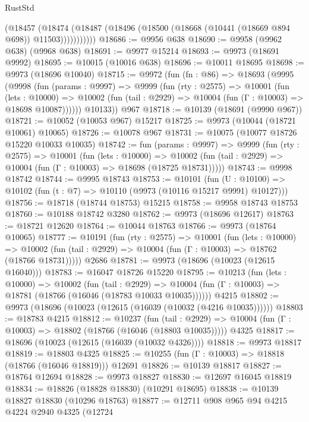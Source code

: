 \begin{lexlean}{RustStd}
\begin{coremodule}
              (@18457
                (@18474
                  (@18487 (@18496 (@18500 (@18668 (@10441 (@18669 @894 @698)) @11503)))))))))))
@18686 := @9956 @638
@18690 := @9958 (@9962 @638) (@9968 @638)
@18691 := @9977 @15214
@18693 := @9973 (@18691 @9992)
@18695 := @10015 (@10016 @638)
@18696 := @10011 @18695
@18698 := @9973 (@18696 @10040)
@18715 := @9972
    (fun (fn : @86) =>
    @18693
      (@9995
        (@9998
          (fun (params : @9997) =>
          @9999
            (fun (rty : @2575) =>
            @10001
              (fun (lets : @10000) =>
              @10002 (fun (tail : @2929) => @10004 (fun (Γ : @10003) => @18698 @10087))))))
        @10133))
    @967
@18718 := @10139 (@18691 (@9990 @967))
@18721 := @10052 (@10053 @967) @15217
@18725 := @9973 (@10044 (@18721 @10061) @10065)
@18726 := @10078 @967
@18731 := @10075 (@10077 @18726 @15220 @10033 @10035)
@18742 := fun (params : @9997) =>
  @9999
    (fun (rty : @2575) =>
    @10001
      (fun (lets : @10000) =>
      @10002 (fun (tail : @2929) => @10004 (fun (Γ : @10003) => @18698 (@18725 @18731)))))
@18743 := @9998 @18742
@18744 := @9995 @18743
@18753 := @10101
    (fun (U : @10100) => @10102 (fun (t : @7) => @10110 (@9973 (@10116 @15217 @9991) @10127)))
@18756 := @18718 (@18744 @18753) @15215
@18758 := @9958 @18743 @18753
@18760 := @10188 @18742 @3280
@18762 := @9973 (@18696 @12617)
@18763 := @18721 @12620
@18764 := @10044 @18763
@18766 := @9973 (@18764 @10065)
@18777 := @10191
    (fun (rty : @2575) =>
    @10001
      (fun (lets : @10000) =>
      @10002 (fun (tail : @2929) => @10004 (fun (Γ : @10003) => @18762 (@18766 @18731)))))
    @2686
@18781 := @9973 (@18696 (@10023 (@12615 @16040)))
@18783 := @16047 @18726 @15220
@18795 := @10213
    (fun (lets : @10000) =>
    @10002
      (fun (tail : @2929) =>
      @10004 (fun (Γ : @10003) => @18781 (@18766 (@16046 (@18783 @10033 @10035))))))
    @4215
@18802 := @9973 (@18696 (@10023 (@12615 (@16039 (@10032 (@4216 @10035))))))
@18803 := @18783 @4215
@18812 := @10237
    (fun (tail : @2929) => @10004 (fun (Γ : @10003) => @18802 (@18766 (@16046 (@18803 @10035)))))
    @4325
@18817 := @18696 (@10023 (@12615 (@16039 (@10032 @4326))))
@18818 := @9973 @18817
@18819 := @18803 @4325
@18825 := @10255 (fun (Γ : @10003) => @18818 (@18766 (@16046 @18819))) @12691
@18826 := @10139 @18817
@18827 := @18764 @12694
@18828 := @9973 @18827
@18830 := @12697 @16045 @18819
@18834 := @18826 (@18828 @18830) (@10291 @18695)
@18838 := @10139 @18827 @18830 (@10296 @18763)
@18877 := @12711
    @908
    @965
    @94
    @4215
    @4224
    @2940
    @4325
    (@12724

\end{coremodule}
\end{lexlean}
